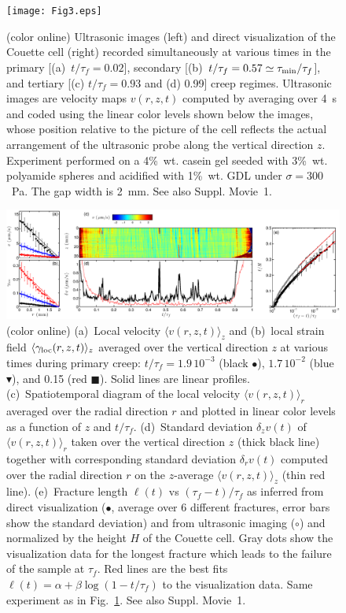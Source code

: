 \documentclass[twocolumn,superscriptaddress,showpacs,preprintnumbers,amsmath,amssymb,prl]{revtex4}
\newcommand\gl{\gamma_{\rm loc}}
\newcommand\taum{\tau_{\rm min}}
\begin{document}
\begin{figure}
\centering
\texttt{[image: Fig3.eps]}
\caption{(color online) Ultrasonic images (left) and direct visualization of the Couette cell (right) recorded simultaneously at various times in the primary [(a)~$t/\tau_f=0.02$], secondary [(b)~$t/\tau_f=0.57\simeq\taum/\tau_f$], and tertiary  [(c) $t/\tau_f=0.93$ and (d) 0.99] creep regimes. Ultrasonic images are velocity maps $v(r,z,t)$ computed by averaging over 4~s and coded using the linear color levels shown below the images, whose position relative to the picture of the cell reflects the actual arrangement of the ultrasonic probe along the vertical direction $z$. Experiment performed on a 4\%~wt. casein gel seeded with 3\%~wt. polyamide spheres and acidified with 1\%~wt. GDL under $\sigma=300$~Pa. The gap width is 2~mm. See also Suppl. Movie~1.
\label{fig3}}
\end{figure} 

\begin{figure}
\centering
\includegraphics[width=18cm,clip]{Fig4.eps}
\caption{(color online) (a)~Local velocity $\langle v(r,z,t)\rangle_z$ and (b)~local strain field $\langle\gl(r,z,t)\rangle_z$ averaged over the vertical direction $z$ at various times during primary creep: $t/\tau_f=1.9\,10^{-3}$ (black $\bullet$), $1.7\,10^{-2}$ (blue $\blacktriangledown$), and 0.15 (red $\blacksquare$). Solid lines are linear profiles. (c)~Spatiotemporal diagram of the local velocity $\langle v(r,z,t)\rangle_r$ averaged over the radial direction $r$ and plotted in linear color levels as a function of $z$ and $t/\tau_f$. (d)~Standard deviation $\delta_z v(t)$ of $\langle v(r,z,t)\rangle_r$ taken over the vertical direction $z$ (thick black line) together with corresponding standard deviation $\delta_r v(t)$ computed over the radial direction $r$ on the $z$-average $\langle v(r,z,t)\rangle_z$ (thin red line). (e)~Fracture length $\ell(t)$ vs $(\tau_f-t)/\tau_f$ as inferred from direct visualization ($\bullet$, average over 6 different fractures, error bars show the standard deviation) and from ultrasonic imaging ($\circ$) and normalized by the height $H$ of the Couette cell. Gray dots show the visualization data for the longest fracture which leads to the failure of the sample at $\tau_f$. Red lines are the best fits $\ell(t)=\alpha+\beta\log(1-t/\tau_f)$ to the visualization data. Same experiment as in Fig.~\ref{fig3}. See also Suppl. Movie~1.
\label{fig4}}
\end{figure} 
\end{document}
